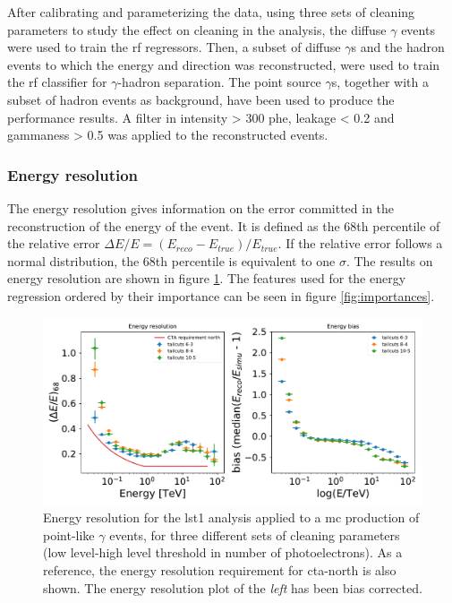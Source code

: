 \documentclass[main.tex]{subfiles}
\begin{document}
After calibrating and parameterizing the data, using three sets of cleaning parameters to study the effect on cleaning in the analysis, the diffuse $\gamma$ events were used to train the \gls{rf} regressors. Then, a subset of diffuse $\gamma$s and the hadron events to which the energy and direction was reconstructed, were used to train the \gls{rf} classifier for $\gamma$-hadron separation.
The point source $\gamma$s, together with a subset of hadron events as background, have been used to produce the performance results. A filter in intensity > 300 phe, leakage < 0.2 and gammaness > 0.5 was applied to the reconstructed events.  

\subsubsection{Energy resolution}

The energy resolution gives information on the error committed in the reconstruction of the energy of the event. It is defined as the 68th percentile of the relative error $\Delta E/E = (E_{reco}-E_{true})/E_{true}$. If the relative error follows a normal distribution, the 68th percentile is equivalent to one $\sigma$. The results on energy resolution are shown in figure \ref{fig:energy}. The features used for the energy regression ordered by their importance can be seen in figure \ref{fig:importances}.

\begin{figure}
\centering
 \includegraphics[width=1\textwidth]{Pictures/energy_resolution.pdf}
  \caption{Energy resolution for the \gls{lst}1 analysis applied to a \gls{mc} production of point-like $\gamma$ events, for three different sets of cleaning parameters (low level-high level threshold in number of photoelectrons). As a reference, the energy resolution requirement for \gls{cta}-north is also shown. The energy resolution plot of the \textit{left} has been bias corrected.}
    \label{fig:energy}
\end{figure}
\end{document}
